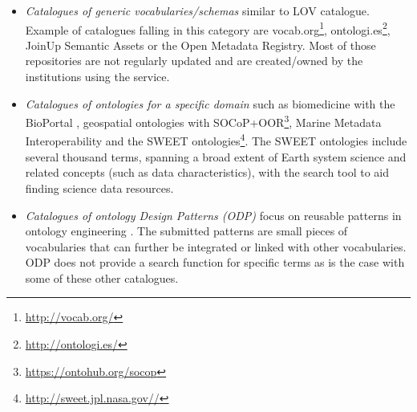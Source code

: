 \documentclass{iosart2c}
\begin{document}
\begin{itemize}
 \item \textit{Catalogues of generic vocabularies/schemas} similar to LOV catalogue. Example of catalogues falling in this category are vocab.org\footnote{\url{http://vocab.org/}}, ontologi.es\footnote{\url{http://ontologi.es/}}, JoinUp Semantic Assets or the Open Metadata Registry. Most of those repositories are not regularly updated and are created/owned by the institutions using the service.
 \item \textit{Catalogues of ontologies for a specific domain} such as biomedicine with the BioPortal \cite{bioportal11}, geospatial ontologies with SOCoP+OOR\footnote{\url{https://ontohub.org/socop}}, Marine Metadata Interoperability and the SWEET \cite{sweet05} ontologies\footnote{\url{http://sweet.jpl.nasa.gov//}}. The SWEET ontologies include several thousand terms, spanning a broad extent of Earth system science and related concepts (such as data characteristics), with the search tool to aid finding science data resources. 
 \item \textit{Catalogues of ontology Design Patterns (ODP)} focus on reusable patterns in ontology engineering \cite{presutti08}. The submitted patterns are small pieces of vocabularies that can further be integrated or linked with other vocabularies. ODP does not provide a search function for specific terms as is the case with some of these other catalogues. 
 

\end{itemize}
\end{document}
